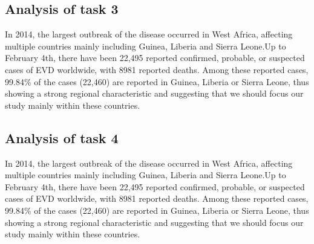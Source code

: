 \subsection{Analysis of task 3}

\par In 2014, the largest outbreak of the disease occurred in West Africa, affecting multiple countries mainly including Guinea, Liberia and Sierra Leone.\cite{CDC}Up to February 4th, there have been 22,495 reported confirmed, probable, or suspected cases of EVD worldwide, with 8981 reported deaths. Among these reported cases, 99.84\% of the cases (22,460) are reported in Guinea, Liberia or Sierra Leone, thus showing a strong regional characteristic and suggesting that we should focus our study mainly within these countries.

\subsection{Analysis of task 4}

\par In 2014, the largest outbreak of the disease occurred in West Africa, affecting multiple countries mainly including Guinea, Liberia and Sierra Leone.\cite{CDC}Up to February 4th, there have been 22,495 reported confirmed, probable, or suspected cases of EVD worldwide, with 8981 reported deaths. Among these reported cases, 99.84\% of the cases (22,460) are reported in Guinea, Liberia or Sierra Leone, thus showing a strong regional characteristic and suggesting that we should focus our study mainly within these countries.
